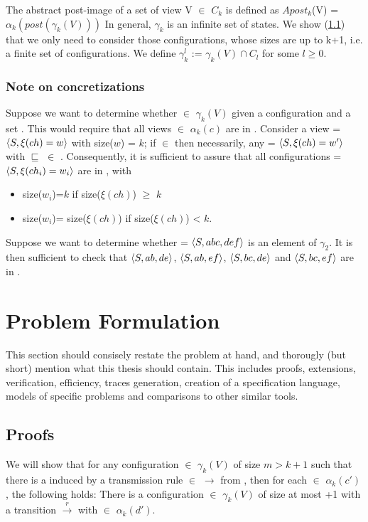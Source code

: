 The abstract post-image of a set of view V $\in$ $C_k$ is defined as $Apost_k$(V) = $\alpha_k(post(\gamma_k(V)))$ In general, $\gamma_k$ is an infinite set of states. We show (\ref{proof}) that we only need to consider those configurations, whose sizes are up to k+1, i.e. a finite set of configurations. We define $\gamma_k^l$ := $\gamma_k(V) \cap C_l$ for some $l\geq 0$. 

\subsubsection{Note on concretizations}
Suppose we want to determine whether  $\in$ $\gamma_k(V)$ given a configuration  and a set . This would require that all views  $\in$ $\alpha_k(c)$ are in . Consider a view  = $\langle S, \xi(ch)=w\rangle$ with size($w$) = $k$; if  $\in$  then necessarily, any  = $\langle S, \xi(ch)=w'\rangle$ with  $\sqsubseteq$  $\in$ . Consequently, it is sufficient to assure that all configurations  = $\langle S,\xi(ch_i)=w_i\rangle$ are in , with

\begin{itemize}
\item
size($w_i$)=$k$ if size($\xi(ch)$) $\geq$ $k$
\item
size($w_i$)= size($\xi(ch)$) if size($\xi(ch)$) < $k$.
\end{itemize}

 Suppose we want to determine whether  = $\langle S, abc, def\rangle$ is an element of $\gamma_2$. It is then sufficient to check that $\langle S,ab,de\rangle$, $\langle S,ab,ef\rangle$, $\langle S,bc ,de\rangle$ and $\langle S,bc,ef\rangle$ are in .


\section{Problem Formulation}
This section should consisely restate the problem at hand, and thorougly (but short) mention what this thesis should contain. This includes proofs, extensions, verification, efficiency, traces generation, creation of a specification language, models of specific problems and comparisons to other similar tools.


\subsection{Proofs}
\label{proof}

We will show that for any configuration  $\in$ $\gamma_k(V)$ of size $m > k + 1$ such that there is a  induced by a transmission rule  $\in$ $\rightarrow$ from , then for each  $\in$ $\alpha_k(c')$, the following holds: There is a configuration  $\in$ $\gamma_k(V)$ of size at most +1 with a transition  $\xrightarrow{r}$  with  $\in$ $\alpha_k(d')$. 

